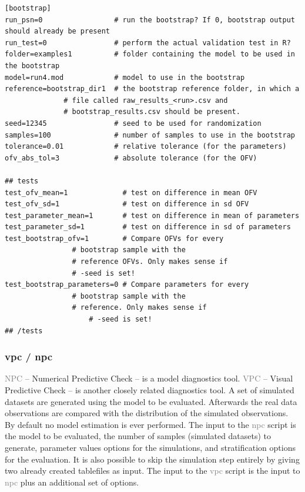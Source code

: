 \documentclass[a4,11pt]{report} \usepackage[pdftex]{graphicx}
\newcommand{\psn}[1]{\textcolor{Grey}{#1}}
\begin{document}
\begin{lstlisting}
[bootstrap]
run_psn=0                 # run the bootstrap? If 0, bootstrap output should already be present
run_test=0                # perform the actual validation test in R?
folder=examples1          # folder containing the model to be used in the bootstrap
model=run4.mod            # model to use in the bootstrap
reference=bootstrap_dir1  # the bootstrap reference folder, in which a
			  # file called raw_results_<run>.csv and
			  # bootstrap_results.csv should be present.
seed=12345                # seed to be used for randomization
samples=100               # number of samples to use in the bootstrap
tolerance=0.01            # relative tolerance (for the parameters)
ofv_abs_tol=3             # absolute tolerance (for the OFV)

## tests
test_ofv_mean=1             # test on difference in mean OFV
test_ofv_sd=1               # test on difference in sd OFV
test_parameter_mean=1       # test on difference in mean of parameters
test_parameter_sd=1         # test on difference in sd of parameters
test_bootstrap_ofv=1	    # Compare OFVs for every
			    # bootstrap sample with the
		 	    # reference OFVs. Only makes sense if
		 	    # -seed is set!
test_bootstrap_parameters=0 # Compare parameters for every
			    # bootstrap sample with the
		 	    # reference. Only makes sense if
		            # -seed is set!
## /tests
\end{lstlisting}

\subsubsection{vpc / npc}
\psn{NPC} – Numerical Predictive Check – is a model diagnostics
tool. \psn{VPC} – Visual Predictive Check – is another closely related
diagnostics tool. A set of simulated datasets are generated using the
model to be evaluated. Afterwards the real data observations are
compared with the distribution of the simulated observations. By
default no model estimation is ever performed. The input to the
\psn{npc} script is the model to be evaluated, the number of samples
(simulated datasets) to generate, parameter values options for the
simulations, and stratification options for the evaluation. It is also
possible to skip the simulation step entirely by giving two already
created tablefiles as input. The input to the \psn{vpc} script is the
input to \psn{npc} plus an additional set of options.

\vspace{10pt}
\end{document}
